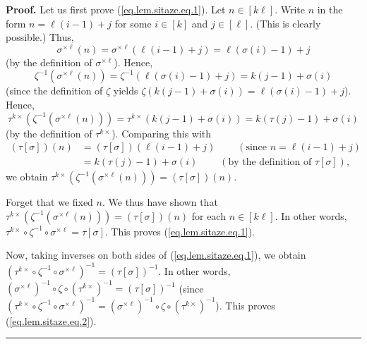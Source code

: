\documentclass[numbers=enddot,12pt,final,onecolumn,notitlepage]{scrartcl}%
\theoremstyle{definition}
\newenvironment{proof}[1][Proof]{\noindent\textbf{#1.} }{\ \rule{0.5em}{0.5em}}
\begin{document}
\begin{proof}
Let us first prove (\ref{eq.lem.sitaze.eq.1}). Let $n\in\left[  k\ell\right]
$. Write $n$ in the form $n=\ell\left(  i-1\right)  +j$ for some $i\in\left[
k\right]  $ and $j\in\left[  \ell\right]  $. (This is clearly possible.) Thus,%
\[
\sigma^{\times\ell}\left(  n\right)  =\sigma^{\times\ell}\left(  \ell\left(
i-1\right)  +j\right)  =\ell\left(  \sigma\left(  i\right)  -1\right)  +j
\]
(by the definition of $\sigma^{\times\ell}$). Hence,%
\[
\zeta^{-1}\left(  \sigma^{\times\ell}\left(  n\right)  \right)  =\zeta
^{-1}\left(  \ell\left(  \sigma\left(  i\right)  -1\right)  +j\right)
=k\left(  j-1\right)  +\sigma\left(  i\right)
\]
(since the definition of $\zeta$ yields $\zeta\left(  k\left(  j-1\right)
+\sigma\left(  i\right)  \right)  =\ell\left(  \sigma\left(  i\right)
-1\right)  +j$). Hence,%
\[
\tau^{k\times}\left(  \zeta^{-1}\left(  \sigma^{\times\ell}\left(  n\right)
\right)  \right)  =\tau^{k\times}\left(  k\left(  j-1\right)  +\sigma\left(
i\right)  \right)  =k\left(  \tau\left(  j\right)  -1\right)  +\sigma\left(
i\right)
\]
(by the definition of $\tau^{k\times}$). Comparing this with%
\begin{align*}
\left(  \tau\left[  \sigma\right]  \right)  \left(  n\right)   &  =\left(
\tau\left[  \sigma\right]  \right)  \left(  \ell\left(  i-1\right)  +j\right)
\ \ \ \ \ \ \ \ \ \ \left(  \text{since }n=\ell\left(  i-1\right)  +j\right)
\\
&  =k\left(  \tau\left(  j\right)  -1\right)  +\sigma\left(  i\right)
\ \ \ \ \ \ \ \ \ \ \left(  \text{by the definition of }\tau\left[
\sigma\right]  \right)  ,
\end{align*}
we obtain $\tau^{k\times}\left(  \zeta^{-1}\left(  \sigma^{\times\ell}\left(
n\right)  \right)  \right)  =\left(  \tau\left[  \sigma\right]  \right)
\left(  n\right)  $.

Forget that we fixed $n$. We thus have shown that $\tau^{k\times}\left(
\zeta^{-1}\left(  \sigma^{\times\ell}\left(  n\right)  \right)  \right)
=\left(  \tau\left[  \sigma\right]  \right)  \left(  n\right)  $ for each
$n\in\left[  k\ell\right]  $. In other words, $\tau^{k\times}\circ\zeta
^{-1}\circ\sigma^{\times\ell}=\tau\left[  \sigma\right]  $. This proves
(\ref{eq.lem.sitaze.eq.1}).

Now, taking inverses on both sides of (\ref{eq.lem.sitaze.eq.1}), we obtain
$\left(  \tau^{k\times}\circ\zeta^{-1}\circ\sigma^{\times\ell}\right)
^{-1}=\left(  \tau\left[  \sigma\right]  \right)  ^{-1}$. In other words,
$\left(  \sigma^{\times\ell}\right)  ^{-1}\circ\zeta\circ\left(  \tau
^{k\times}\right)  ^{-1}=\left(  \tau\left[  \sigma\right]  \right)  ^{-1}$
(since $\left(  \tau^{k\times}\circ\zeta^{-1}\circ\sigma^{\times\ell}\right)
^{-1}=\left(  \sigma^{\times\ell}\right)  ^{-1}\circ\zeta\circ\left(
\tau^{k\times}\right)  ^{-1}$). This proves (\ref{eq.lem.sitaze.eq.2}).
\end{proof}
\end{document}
